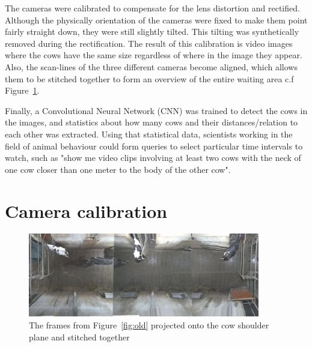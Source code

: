 \documentclass{cta-author}
\begin{document}
The cameras were calibrated to compensate for the lens distortion and rectified. Although the physically orientation of the cameras were fixed to make them point fairly straight down, they were still slightly tilted. This tilting was
synthetically removed during the rectification. The result of this calibration is video images where the cows
have the same size regardless of where in the image they appear. Also, the scan-lines of the three different
cameras become aligned, which allows them to be stitched together to form an overview of the entire waiting
area c.f Figure~\ref{fig:stitch}.

Finally, a Convolutional Neural Network (CNN)  was trained to detect the cows in the images, and statistics
about how many cows and their distances/relation to each other was extracted. Using that statistical data,
scientists working in the field of animal behaviour could form queries to select particular time intervals to
watch, such as "show me video clips involving at least two cows with the neck of one cow closer than one
meter to the body of the other cow".


\section{Camera calibration}

\begin{figure}[t]
\begin{center}
  \includegraphics[width=0.9\textwidth]{full.jpg}
\end{center}
  \caption{The frames from Figure~\ref{fig:old} projected onto the cow shoulder plane and stitched together}
  \label{fig:stitch}
\end{figure}
\end{document}
